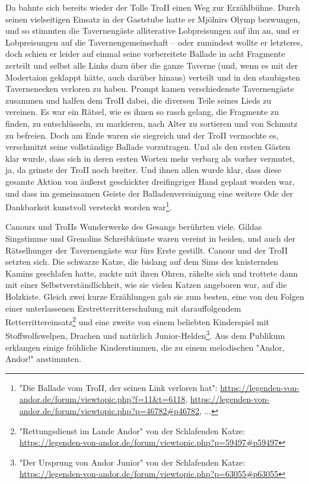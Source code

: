 Da bahnte sich bereits wieder der Tolle TroII einen Weg zur Erzählbühne. Durch seinen vielseitigen Einsatz in der Gaststube hatte er Mjölnirs Olymp bezwungen, und so stimmten die Tavernengäste alliterative Lobpreisungen auf ihn an, und er Lobpreisungen auf die Tavernengemeinschaft – oder zumindest wollte er letzteres, doch schien er leider auf einmal seine vorbereitete Ballade in acht Fragmente zerteilt und selbst alle Links dazu über die ganze Taverne (und, wenn es mit der 
Modertaion %
geklappt hätte, auch darüber hinaus) verteilt und in den staubigsten Tavernenecken verloren zu haben. Prompt kamen verschiedenste Tavernengäste zusammen und halfen dem TroII dabei, die diversen Teile seines Lieds zu vereinen. Es war ein Rätsel, wie es ihnen so rasch gelang, die Fragmente zu finden, zu entschlüsseln, zu markieren, nach Alter zu sortieren und von Schmutz zu befreien. Doch am Ende waren sie siegreich und der TroII vermochte es, verschmitzt seine vollständige Ballade vorzutragen. Und als den ersten Gästen klar wurde, dass sich in deren ersten Worten mehr verbarg als vorher vermutet, ja, da grinste der TroII noch breiter. Und ihnen allen wurde klar, dass diese gesamte Aktion von äußerst geschickter dreifingriger Hand geplant worden war, und dass im gemeinsamen Geiste der Balladenvereinigung eine weitere Ode der Dankbarkeit kunstvoll versteckt worden war\footnote{"Die Ballade vom TroII, der seinen Link verloren hat": \url{https://legenden-von-andor.de/forum/viewtopic.php?f=11&t=6118}, \url{https://legenden-von-andor.de/forum/viewtopic.php?p=46782\#p46782}, ...}.

Canours und TroIIs Wunderwerke des Gesangs berührten viele. Gildas Singstimme und Grenolins Schreibkünste waren vereint in beiden, und auch der Rätselhunger der Tavernengäste war fürs Erste gestillt. Canour und der TroII setzten sich. Die schwarze Katze, die bislang auf dem Sims des knisternden Kamins geschlafen hatte, zuckte mit ihren Ohren, räkelte sich und trottete dann mit einer Selbstverständlichkeit, wie sie vielen Katzen angeboren war, auf die Holzkiste. Gleich zwei kurze Erzählungen gab sie zum besten, eine von den Folgen einer unterlassenen Erstretterritterschulung mit darauffolgendem Retterrittereinsatz\footnote{"Rettungsdienst im Lande Andor" von der Schlafenden Katze: \url{https://legenden-von-andor.de/forum/viewtopic.php?p=59497\#p59497}} und eine zweite von einem beliebten Kinderspiel mit Stoffwolfswelpen, Drachen und natürlich Junior-Helden\footnote{"Der Ursprung von Andor Junior" von der Schlafenden Katze: \url{https://legenden-von-andor.de/forum/viewtopic.php?p=63055\#p63055}}. Aus dem Publikum erklangen einige fröhliche Kinderstimmen, die zu einem melodischen "Andor, Andor!" anstimmten.

